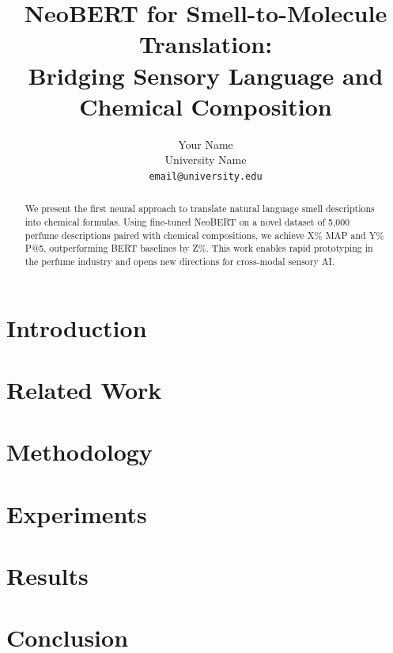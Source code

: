 \documentclass[11pt,a4paper]{article}
\title{NeoBERT for Smell-to-Molecule Translation: \\
Bridging Sensory Language and Chemical Composition}
\author{Your Name \\
  University Name \\
  \texttt{email@university.edu}}
\begin{document}
\maketitle

\begin{abstract}
We present the first neural approach to translate natural language smell 
descriptions into chemical formulas. Using fine-tuned NeoBERT on a novel 
dataset of 5,000 perfume descriptions paired with chemical compositions, 
we achieve X\% MAP and Y\% P@5, outperforming BERT baselines by Z\%. 
This work enables rapid prototyping in the perfume industry and opens 
new directions for cross-modal sensory AI.
\end{abstract}

\section{Introduction}


\section{Related Work}


\section{Methodology}


\section{Experiments}


\section{Results}


\section{Conclusion}




\end{document}
